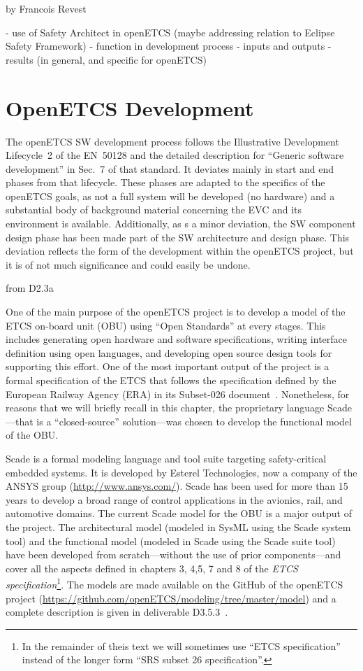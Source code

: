 \documentclass{template/openetcs_report}
\begin{document}
by Francois Revest

- use of Safety Architect in openETCS (maybe addressing relation to Eclipse Safety Framework)
- function in development process
- inputs and outputs
- results (in general, and specific for openETCS)

\chapter{OpenETCS Development}
\label{sec:development-process}

The openETCS SW development process follows the Illustrative
Development Lifecycle~2 \cite[Fig.~4]{EN50128:2011} of the EN~50128
and the detailed description for ``Generic software development'' in
Sec.~7 of that standard. It deviates mainly in start and end phases
from that lifecycle. These phases are adapted to the specifics of the
openETCS goals, as not a full system will be developed (no hardware)
and a substantial body of background material concerning the EVC and
its environment is available. Additionally, as s a minor deviation,
the SW component design phase has been made part of the SW
architecture and design phase. This deviation reflects the form of the
development within the openETCS project, but it is of not much
significance and could easily be undone.

from D2.3a


One of the main purpose of the openETCS project is to develop a model
of the ETCS on-board unit (OBU) using ``Open Standards'' at every
stages. This includes generating open hardware and software
specifications, writing interface definition using open languages, and
developing open source design tools for supporting this effort. One of
the most important output of the project is a formal specification of
the ETCS that follows the specification defined by the European
Railway Agency (ERA) in its Subset-026
document~\cite{subset-026}. Nonetheless, for reasons that we will
briefly recall in this chapter, the proprietary language Scade---that
is a ``closed-source'' solution---was chosen to develop the functional
model of the OBU.

Scade is a formal modeling language and tool suite targeting
safety-critical embedded systems. It is developed by Esterel
Technologies, now a company of the ANSYS group
(\url{http://www.ansys.com/}). Scade has been used for more than 15
years to develop a broad range of control applications in the
avionics, rail, and automotive domains. The current Scade model for
the OBU is a major output of the project. The architectural model
(modeled in SysML using the Scade system tool) and the functional
model (modeled in Scade using the Scade suite tool) have been
developed from scratch---without the use of prior components---and
cover all the aspects defined in chapters 3, 4,5, 7 and 8 of the
\emph{ETCS specification}\footnote{In the remainder of theis text we
  will sometimes use ``ETCS specification'' instead of the longer form
  ``SRS subset 26 specification''.}. The models are made available on
the GitHub of the openETCS project
(\url{https://github.com/openETCS/modeling/tree/master/model}) and a
complete description is given in deliverable D3.5.3~\cite{d353}.
\end{document}

